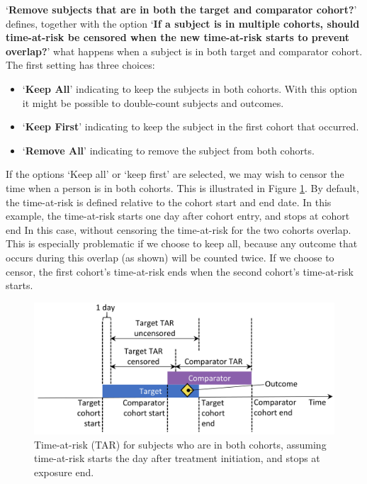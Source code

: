 \documentclass[]{book}
\providecommand{\tightlist}{%
  \setlength{\itemsep}{0pt}\setlength{\parskip}{0pt}}
\begin{document}
`\textbf{Remove subjects that are in both the target and comparator
cohort?}' defines, together with the option `\textbf{If a subject is in
multiple cohorts, should time-at-risk be censored when the new
time-at-risk starts to prevent overlap?}' what happens when a subject is
in both target and comparator cohort. The first setting has three
choices:

\begin{itemize}
\tightlist
\item
  `\textbf{Keep All}' indicating to keep the subjects in both cohorts.
  With this option it might be possible to double-count subjects and
  outcomes.
\item
  `\textbf{Keep First}' indicating to keep the subject in the first
  cohort that occurred.
\item
  `\textbf{Remove All}' indicating to remove the subject from both
  cohorts.
\end{itemize}

If the options `Keep all' or `keep first' are selected, we may wish to
censor the time when a person is in both cohorts. This is illustrated in
Figure \ref{fig:tar}. By default, the time-at-risk is defined relative
to the cohort start and end date. In this example, the time-at-risk
starts one day after cohort entry, and stops at cohort end In this case,
without censoring the time-at-risk for the two cohorts overlap. This is
especially problematic if we choose to keep all, because any outcome
that occurs during this overlap (as shown) will be counted twice. If we
choose to censor, the first cohort's time-at-risk ends when the second
cohort's time-at-risk starts.

\begin{figure}

{\centering \includegraphics[width=0.8\linewidth]{images/PopulationLevelEstimation/tar} 

}

\caption{Time-at-risk (TAR) for subjects who are in both cohorts, assuming time-at-risk starts the day after treatment initiation, and stops at exposure end.}\label{fig:tar}
\end{figure}
\end{document}
